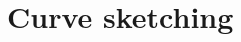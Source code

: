 \documentclass[../book/calcnotes.tex]{subfiles}
\begin{document}
\section{Curve sketching}
\label{sec:curve-sketching}

\begin{exercises}
\end{exercises}
\end{document}
